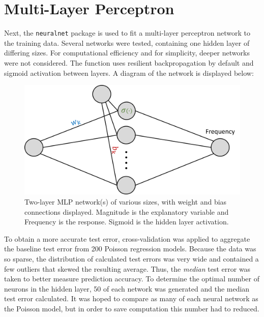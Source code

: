 
\section{Multi-Layer Perceptron}

Next, the \texttt{neuralnet} package \cite{neuralnet} is used to fit a multi-layer perceptron network to the training data.  Several networks were tested, containing one hidden layer of differing sizes.  For computational efficiency and for simplicity, deeper networks were not considered.  The function uses resilient backpropagation by default and sigmoid activation between layers.  A diagram of the network is displayed below:

\begin{figure}[H]
    \center
    \includegraphics[width=0.55\linewidth]{Figures/MLPdiag.png}
    \caption{\footnotesize{Two-layer MLP network(s) of various sizes, with weight and bias connections displayed.  Magnitude is the explanatory variable and Frequency is the response.  Sigmoid is the hidden layer activation.}}
    \label{tohoku_unfit}
\end{figure}

To obtain a more accurate test error, cross-validation was applied to aggregate the baseline test error from 200 Poisson regression models. Because the data was so sparse, the distribution of calculated test errors was very wide and contained a few outliers that skewed the resulting average.  Thus, the \textit{median} test error was taken to better measure prediction accuracy.  To determine the optimal number of neurons in the hidden layer, 50 of each network was generated and the median test error calculated.  It was hoped to compare as many of each neural network as the Poisson model, but in order to save computation this number had to reduced.

